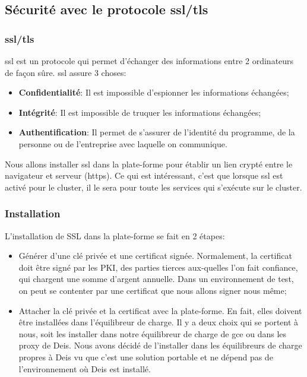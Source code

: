 \begin{onehalfspace}
\subsection{Sécurité avec le protocole \acrshort{ssl}/\acrshort{tls}}

\subsubsection{\acrshort{ssl}/\acrshort{tls}}


\acrshort{ssl} est un protocole qui permet d'échanger des informations entre 2 ordinateurs de façon sûre. \acrshort{ssl} assure 3 choses:

\begin{itemize}
	\item \textbf{Confidentialité}: Il est impossible d'espionner les informations échangées;
	\item \textbf{Intégrité}: Il est impossible de truquer les informations échangées;
	\item \textbf{Authentification}: Il permet de s'assurer de l'identité du programme, de la personne ou de l'entreprise avec laquelle on communique.
\end{itemize}



Nous allons installer \acrshort{ssl} dans la plate-forme pour établir un lien crypté entre le navigateur et serveur (\acrshort{https}). Ce qui est intéressant, c'est que lorsque \acrshort{ssl} est activé pour le cluster, il le sera pour toute les services qui s'exécute sur le cluster.



\subsubsection{Installation}

L'installation de SSL dans la plate-forme se fait en 2 étapes:
\begin{itemize}
	\item Générer d'une clé privée et une certificat signée. Normalement, la certificat doit être signé par les PKI, des parties tierces aux-quelles l'on fait confiance, qui chargent une somme d'argent annuelle. Dans un environnement de test, on peut se contenter par une certificat que nous allons signer nous même;
	\item Attacher la clé privée et la certificat avec la plate-forme. En fait, elles doivent être installées dans l'équilibreur de charge. Il y a deux choix qui se portent à nous, soit les installer dans notre équilibreur de charge de \acrshort{gce} ou dans les proxy de Deis. Nous avons décidé de l'installer dans les équilibreurs de charge propres à Deis vu que c'est une solution portable et ne dépend pas de l'environnement où Deis est installé.
\end{itemize}


\end{onehalfspace}

